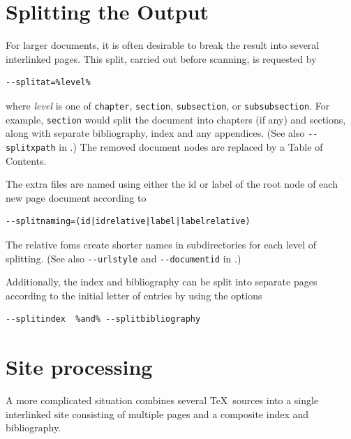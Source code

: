 \documentclass{book}
\newcommand{\shellcode}{\lstinline[style=shell]}
\begin{document}
\section[Splitting]{Splitting the Output}\label{usage.splitting}
For larger documents, it is often desirable to break the 
result into several interlinked pages. This split,
carried out before scanning, is requested by 
\begin{lstlisting}[style=shell]
--splitat=%level%
\end{lstlisting}
where \textit{level} is one of \texttt{chapter},
\texttt{section}, \texttt{subsection}, or \texttt{subsubsection}.
For example, \texttt{section} would split the document into
chapters (if any) and sections, along with separate
bibliography, index and any appendices.
(See also \shellcode{--splitxpath} in .)
The removed document nodes are replaced by a Table of Contents.

The extra files are named using either the id or label
of the root node of each new page document according to
\begin{lstlisting}[style=shell]
--splitnaming=(id|idrelative|label|labelrelative)
\end{lstlisting}
The relative foms create shorter names in subdirectories for each
level of splitting.
(See also \shellcode{--urlstyle} and  \shellcode{--documentid} in .)

Additionally, the index and bibliography can be split
into separate pages according to the initial letter of entries by using the options
\begin{lstlisting}[style=shell]
--splitindex  %and% --splitbibliography
\end{lstlisting}

\section[Sites]{Site processing}\label{usage.site}
A more complicated situation combines several \TeX\ sources
into a single interlinked site consisting of multiple pages
and a composite index and bibliography.
\end{document}
